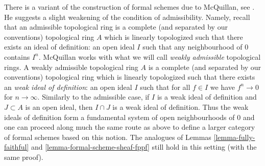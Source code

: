 \begin{remark}
\label{remark-mcquillan}
There is a variant of the construction of formal schemes due to
McQuillan, see \cite{McQuillan}.
He suggests a slight weakening of the condition of admissibility.
Namely, recall that an admissible topological ring is a complete
(and separated by our conventions) topological ring $A$
which is linearly topologized such that there exists an
ideal of definition: an
open ideal $I$ such that any neighbourhood of $0$ contains $I^n$.
McQuillan works with what we will call {\it weakly admissible}
topological rings. A weakly admissible topological ring $A$ is a
complete (and separated by our conventions) topological ring
which is linearly topologized such that there exists an
{\it weak ideal of definition}: an open ideal $I$ such that
for all $f \in I$ we have
$f^n \to 0$ for $n \to \infty$. Similarly to the admissible case,
if $I$ is a weak ideal of definition and $J \subset A$ is an
open ideal, then $I \cap J$ is a weak ideal of definition.
Thus the weak ideals of definition form a fundamental system of
open neighbourhoods of $0$ and
one can proceed along much the same route as above
to define a larger category of formal schemes based
on this notion. The analogues of Lemmas \ref{lemma-fully-faithful} and
\ref{lemma-formal-scheme-sheaf-fppf}
still hold in this setting (with the same proof).
\end{remark}

